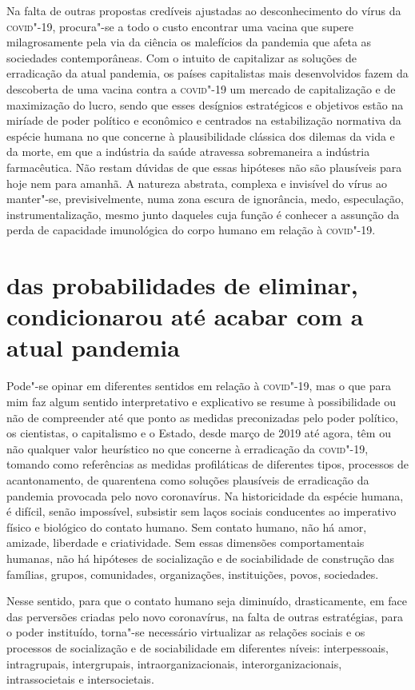 Na falta de outras propostas credíveis ajustadas ao desconhecimento do
vírus da \textsc{covid}"-19, procura"-se a todo o custo encontrar uma vacina que
supere milagrosamente pela via da ciência os malefícios da pandemia que
afeta as sociedades contemporâneas. Com o intuito de capitalizar as
soluções de erradicação da atual pandemia, os países capitalistas mais
desenvolvidos fazem da descoberta de uma vacina contra a \textsc{covid}"-19 um
mercado de capitalização e de maximização do lucro, sendo que esses
desígnios estratégicos e objetivos estão na miríade de poder político e
econômico e centrados na estabilização normativa da espécie humana no
que concerne à plausibilidade clássica dos dilemas da vida e da morte,
em que a indústria da saúde atravessa sobremaneira a indústria
farmacêutica. Não restam dúvidas de que essas hipóteses não são
plausíveis para hoje nem para amanhã. A natureza abstrata, complexa e
invisível do vírus ao manter"-se, previsivelmente, numa zona escura de
ignorância, medo, especulação, instrumentalização, mesmo junto daqueles
cuja função é conhecer a assunção da perda de capacidade imunológica do
corpo humano em relação à \textsc{covid}"-19.

\section{das probabilidades de eliminar, condicionar\break ou até acabar com a atual pandemia}

Pode"-se opinar em diferentes sentidos em relação à \textsc{covid}"-19, mas o que
para mim faz algum sentido interpretativo e explicativo se resume à
possibilidade ou não de compreender até que ponto as medidas
preconizadas pelo poder político, os cientistas, o capitalismo e o
Estado, desde março de 2019 até agora, têm ou não qualquer valor
heurístico no que concerne à erradicação da \textsc{covid}"-19, tomando como
referências as medidas profiláticas de diferentes tipos, processos de
acantonamento, de quarentena como soluções plausíveis de erradicação da
pandemia provocada pelo novo coronavírus. Na historicidade da espécie
humana, é difícil, senão impossível, subsistir sem laços sociais
conducentes ao imperativo físico e biológico do contato humano. Sem
contato humano, não há amor, amizade, liberdade e criatividade. Sem
essas dimensões comportamentais humanas, não há hipóteses de
socialização e de sociabilidade de construção das famílias, grupos,
comunidades, organizações, instituições, povos, sociedades.

Nesse sentido, para que o contato humano seja diminuído, drasticamente,
em face das perversões criadas pelo novo coronavírus, na falta de outras
estratégias, para o poder instituído, torna"-se necessário virtualizar as
relações sociais e os processos de socialização e de sociabilidade em
diferentes níveis: interpessoais, intragrupais, intergrupais,
intraorganizacionais, interorganizacionais, intrassocietais e
intersocietais.

